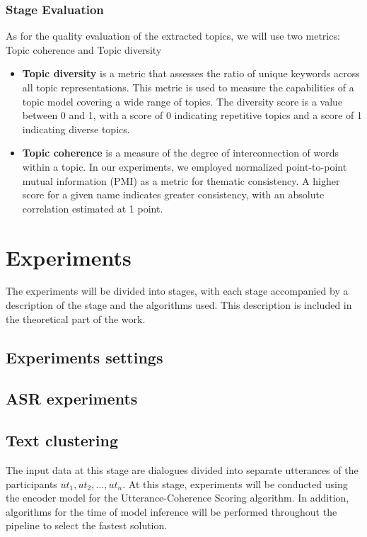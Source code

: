 \documentclass[PMI,VKR]{HSEUniversity}
\begin{document}
\subsection{Stage Evaluation}
As for the quality evaluation of the extracted topics, we will use two metrics: Topic coherence and Topic diversity
\begin{itemize}
    \item \textbf{Topic diversity} \cite{topicdiversity:2019} is a metric that assesses the ratio of unique keywords across all topic representations. This metric is used to measure the capabilities of a topic model covering a wide range of topics. The diversity score is a value between 0 and 1, with a score of 0 indicating repetitive topics and a score of 1 indicating diverse topics.
    \item \textbf{Topic coherence} \cite{topiccoh:2009} is a measure of the degree of interconnection of words within a topic. In our experiments, we employed normalized point-to-point mutual information (PMI) as a metric for thematic consistency. A higher score for a given name indicates greater consistency, with an absolute correlation estimated at 1 point.
    \end{itemize}
\newpage
\chapter{Experiments}

The experiments will be divided into stages, with each stage accompanied by a description of the stage and the algorithms used. 
This description is included in the theoretical part of the work.


\section{Experiments settings}




\section{ASR experiments}



\section{Text clustering}

The input data at this stage are dialogues divided into separate utterances of the participants ${ut_1, ut_2, \dots, ut_n}$.
At this stage, experiments will be conducted using the encoder model for the Utterance-Coherence Scoring algorithm. 
In addition, algorithms for the time of model inference will be performed throughout the pipeline to select the fastest solution.
\end{document}
